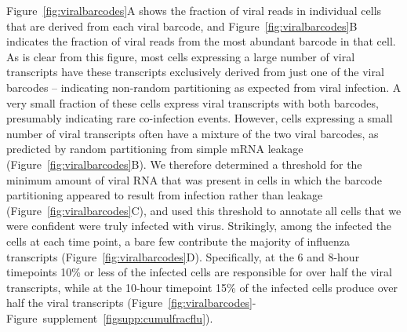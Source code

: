 \documentclass[9pt,lineno]{elife}
\begin{document}
Figure~\ref{fig:viralbarcodes}A shows the fraction of viral reads in individual cells that are derived from each viral barcode, and Figure~\ref{fig:viralbarcodes}B indicates the fraction of viral reads from the most abundant barcode in that cell.
As is clear from this figure, most cells expressing a large number of viral transcripts have these transcripts exclusively derived from just one of the viral barcodes -- indicating non-random partitioning as expected from viral infection.
A very small fraction of these cells express viral transcripts with both barcodes, presumably indicating rare co-infection events.
However, cells expressing a small number of viral transcripts often have a mixture of the two viral barcodes, as predicted by random partitioning from simple mRNA leakage (Figure~\ref{fig:viralbarcodes}B).
We therefore determined a threshold for the minimum amount of viral RNA that was present in cells in which the barcode partitioning appeared to result from infection rather than leakage (Figure~\ref{fig:viralbarcodes}C), and used this threshold to annotate all cells that we were confident were truly infected with virus.
Strikingly, among the infected the cells at each time point, a bare few contribute the majority of influenza transcripts (Figure~\ref{fig:viralbarcodes}D).
Specifically, at the 6 and 8-hour timepoints 10\% or less of the infected cells are responsible for over half the viral transcripts, while at the 10-hour timepoint 15\% of the infected cells produce over half the viral transcripts (Figure~\ref{fig:viralbarcodes}-Figure~supplement~\ref{figsupp:cumulfracflu}).
\end{document}
